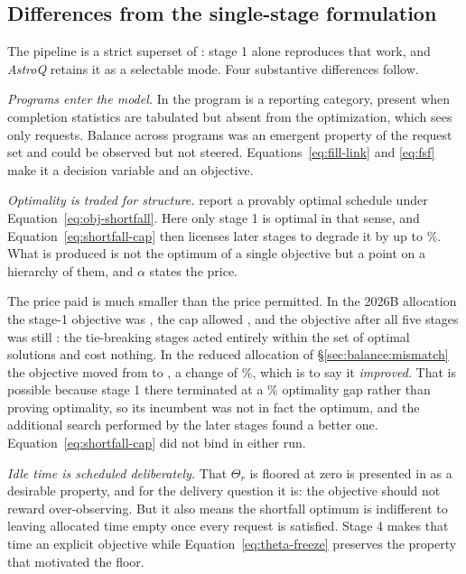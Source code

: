 \documentclass[twocolumn,linenumbers]{aastex63}
\newcommand{\AstroQ}{\textit{AstroQ}\xspace}
\begin{document}
\subsection{Differences from the single-stage formulation}
\label{sec:stages:differences}

The pipeline is a strict superset of \citet{Lubin2025}: stage 1 alone
reproduces that work, and \AstroQ retains it as a selectable mode. Four
substantive differences follow.

\emph{Programs enter the model.} In \citet{Lubin2025} the program is a reporting
category, present when completion statistics are tabulated but absent from the
optimization, which sees only requests. Balance across programs was an emergent
property of the request set and could be observed but not steered.
Equations~\ref{eq:fill-link} and \ref{eq:fsf} make it a decision variable and an
objective.

\emph{Optimality is traded for structure.} \citet{Lubin2025} report a provably
optimal schedule under Equation~\ref{eq:obj-shortfall}. Here only stage 1 is
optimal in that sense, and Equation~\ref{eq:shortfall-cap} then licenses later
stages to degrade it by up to \%. What is produced is
not the optimum of a single objective but a point on a hierarchy of them, and
$\alpha$ states the price.

The price paid is much smaller than the price permitted. In the 2026B
allocation the stage-1 objective was , the cap
allowed , and the objective after all five stages was
still : the tie-breaking stages acted entirely
within the set of optimal solutions and cost nothing. In the reduced allocation
of \S\ref{sec:balance:mismatch} the objective moved from
 to , a change of
\%, which is to say it \emph{improved}. That is
possible because stage 1 there terminated at a
\% optimality gap rather than proving optimality, so
its incumbent was not in fact the optimum, and the additional search performed
by the later stages found a better one. Equation~\ref{eq:shortfall-cap} did not
bind in either run.

\emph{Idle time is scheduled deliberately.} That $\Theta_r$ is floored at zero
is presented in \citet{Lubin2025} as a desirable property, and for the delivery
question it is: the objective should not reward over-observing. But it also
means the shortfall optimum is indifferent to leaving allocated time empty once
every request is satisfied. Stage 4 makes that time an explicit objective while
Equation~\ref{eq:theta-freeze} preserves the property that motivated the floor.
\end{document}
